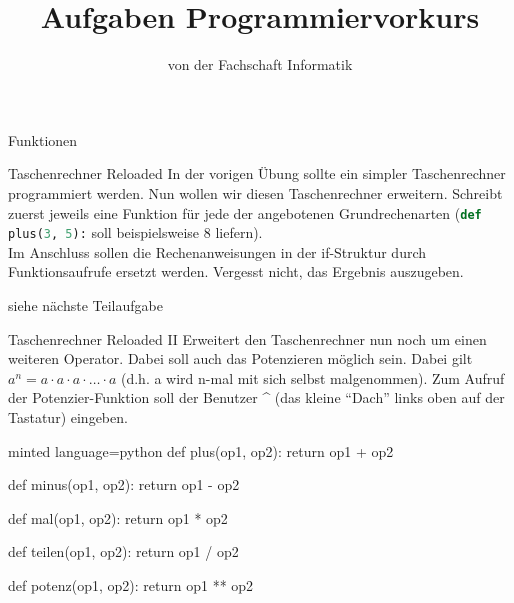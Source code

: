 
\title{Aufgaben Programmiervorkurs}
\subtitle{von der Fachschaft Informatik\hfill\ptitle}

\maketitle{}

\begin{task}[points=auto]{Funktionen}
    \begin{subtask*}[points=0]{Taschenrechner Reloaded }
        In der vorigen Übung sollte ein simpler Taschenrechner programmiert werden. Nun wollen wir diesen Taschenrechner erweitern. Schreibt zuerst jeweils eine Funktion für jede der angebotenen Grundrechenarten (\lstinline[language=python]{def plus(3, 5):} soll beispielsweise 8 liefern).\\
        Im Anschluss sollen die Rechenanweisungen in der if-Struktur durch Funktionsaufrufe ersetzt werden. Vergesst nicht, das Ergebnis auszugeben.

        \begin{solution}
            siehe nächste Teilaufgabe
        \end{solution}
    \end{subtask*}
    \begin{subtask*}[points=0]{Taschenrechner Reloaded II }
        Erweitert den Taschenrechner nun noch um einen weiteren Operator. Dabei soll auch das Potenzieren möglich sein. Dabei gilt $a^n=a\cdot a\cdot a \cdot\ldots\cdot a$ (d.h. a wird n-mal mit sich selbst malgenommen). Zum Aufruf der Potenzier-Funktion soll der Benutzer \^{} (das kleine "`Dach"' links oben auf der Tastatur) eingeben.

        \begin{solution}
            \begin{codeBlock}[]{minted language=python}
                def plus(op1, op2):
                    return op1 + op2


                def minus(op1, op2):
                    return op1 - op2


                def mal(op1, op2):
                    return op1 * op2


                def teilen(op1, op2):
                    return op1 / op2


                def potenz(op1, op2):
                    return op1 ** op2



\end{codeBlock}
\end{solution}
\end{subtask*}
\end{task}
